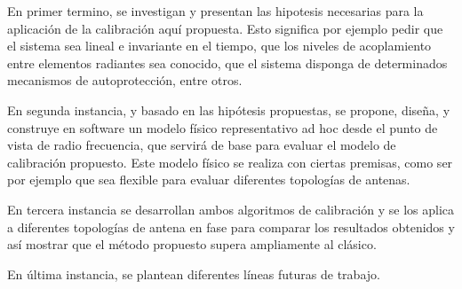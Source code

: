 \documentclass[11pt, oneside]{Thesis} %
\begin{document}
{En primer termino, se investigan y presentan las hipotesis necesarias para la aplicación de la calibración aquí propuesta. 
Esto significa por ejemplo pedir que el sistema sea lineal e invariante en el tiempo, que los niveles de acoplamiento entre 
elementos radiantes sea conocido, que el sistema disponga de determinados mecanismos de autoprotección, entre otros.

En segunda instancia, y basado en las hipótesis propuestas, se propone, diseña, y construye en software un modelo físico 
representativo ad hoc desde el punto de vista de radio frecuencia, que servirá de base para evaluar el modelo de calibración 
propuesto. Este modelo físico se realiza con ciertas premisas, como ser por ejemplo que sea flexible para evaluar diferentes 
topologías de antenas.

En tercera instancia se desarrollan ambos algoritmos de calibración y se los aplica a diferentes topologías de antena en fase 
para comparar los resultados obtenidos y así mostrar que el método propuesto supera ampliamente al clásico.

En última instancia, se plantean diferentes líneas futuras de trabajo.
}

\clearpage %



\clearpage %
\end{document}
